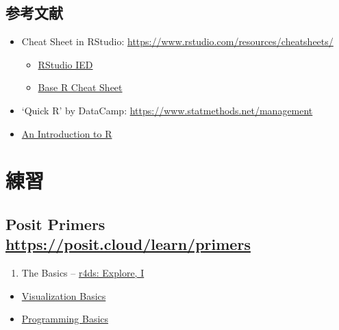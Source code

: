 \documentclass[
  xelatex, ja=standard]{bxjsbook}
\providecommand{\tightlist}{%
  \setlength{\itemsep}{0pt}\setlength{\parskip}{0pt}}
\theoremstyle{definition}
\theoremstyle{definition}
\theoremstyle{definition}
\theoremstyle{definition}
\theoremstyle{remark}
\begin{document}
\hypertarget{ux53c2ux8003ux6587ux732e-1}{%
\subsection{参考文献}\label{ux53c2ux8003ux6587ux732e-1}}

\begin{itemize}
\item
  Cheat Sheet in RStudio: \url{https://www.rstudio.com/resources/cheatsheets/}

  \begin{itemize}
  \tightlist
  \item
    \href{https://raw.githubusercontent.com/rstudio/cheatsheets/main/rstudio-ide.pdf}{RStudio IED}
  \item
    \href{https://github.com/rstudio/cheatsheets/raw/main/base-r.pdf}{Base R Cheat Sheet}
  \end{itemize}
\item
  `Quick R' by DataCamp: \url{https://www.statmethods.net/management}
\item
  \href{https://cran.rstudio.com}{An Introduction to R}
\end{itemize}

\hypertarget{ux7df4ux7fd2-4}{%
\section{練習}\label{ux7df4ux7fd2-4}}

\hypertarget{posit-primers-httpsposit.cloudlearnprimers}{%
\subsection{\texorpdfstring{Posit Primers \url{https://posit.cloud/learn/primers}}{Posit Primers https://posit.cloud/learn/primers}}\label{posit-primers-httpsposit.cloudlearnprimers}}

\begin{enumerate}
\def\labelenumi{\arabic{enumi}.}
\tightlist
\item
  The Basics -- \href{https://r4ds.had.co.nz/explore-intro.html\#explore-intro}{r4ds: Explore, I}
\end{enumerate}

\begin{itemize}
\tightlist
\item
  \href{https://rstudio.cloud/learn/primers/1.1}{Visualization Basics}
\item
  \href{https://rstudio.cloud/learn/primers/1.2}{Programming Basics}
\end{itemize}
\end{document}
